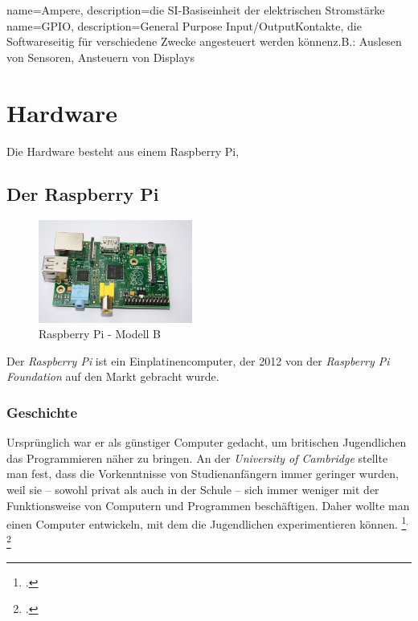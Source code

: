 {
  name=Ampere,
  description={die SI-Basiseinheit der elektrischen Stromstärke}
}
{
  name=GPIO,
  description={General Purpose Input/Output\newline Kontakte, die Softwareseitig für verschiedene Zwecke angesteuert werden können\newline z.B.: Auslesen von Sensoren, Ansteuern von Displays}
}


\chapter{Hardware}

Die Hardware besteht aus einem Raspberry Pi, 
\section{Der Raspberry Pi}
\begin{figure}
 \vspace{-16pt}
 \centering 
 \includegraphics[width=0.45\textwidth]{figures/raspberry.jpg}
 \caption[Raspberry Pi - Modell B]{Raspberry Pi - Modell B\footnotemark}
 \vspace{-50pt}
\end{figure}
Der \textit{Raspberry Pi} ist ein Einplatinencomputer, der 2012 von der  \textit{Raspberry Pi Foundation} auf den Markt gebracht wurde. 
\subsection{Geschichte}
Ursprünglich war er als günstiger Computer gedacht, um britischen Jugendlichen das Programmieren näher zu bringen. An der \textit{University of Cambridge} stellte man fest, dass die Vorkenntnisse von Studienanfängern immer geringer wurden, weil sie -- sowohl privat als auch in der Schule -- sich immer weniger mit der Funktionsweise von Computern und Programmen beschäftigen. Daher wollte man einen Computer entwickeln, mit dem die Jugendlichen experimentieren können.
\footcite{aboutraspberry}$^,$
\footcite{wiki:raspi_geschichte}

